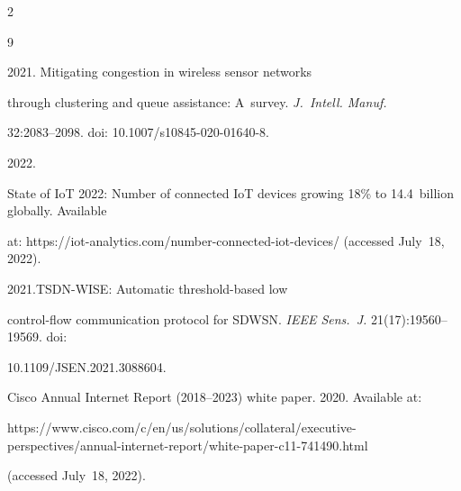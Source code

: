 




  \begin{multicols}{2}





\renewcommand{\bibname}{\protect\rmfamily References}







{\small\frenchspacing


 {%




 \begin{thebibliography}{9}




 2021. Mitigating congestion in wireless sensor networks 


through clustering and queue assistance: A~survey. \textit{J.~Intell. Manuf.}  


32:2083--2098. doi: 10.1007/s10845-020-01640-8.




 2022.


State of IoT 2022: Number of connected IoT devices growing 18\% to 14.4~billion globally. Available 


at: {\sf https://iot-analytics.com/number-connected-iot-devices/} (accessed July~18, 2022).




 2021.TSDN-WISE: Automatic threshold-based low  


control-flow communication protocol for SDWSN. \textit{IEEE Sens.~J.} 21(17):19560--19569. doi: 


10.1109/JSEN.2021.3088604.




Cisco Annual Internet Report (2018--2023) white paper. 2020. Available at: {\sf 


https://www.cisco.com/c/en/us/\linebreak solutions/collateral/executive-perspectives/annual-internet-report/white-paper-c11-741490.html} 


(accessed July~18, 2022).






\end{thebibliography}}}
\end{multicols}
